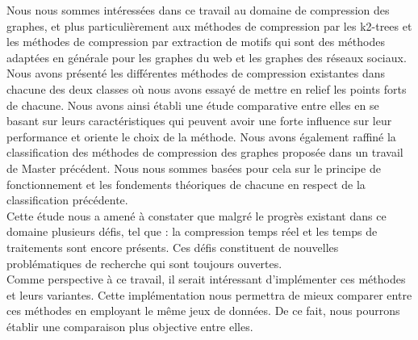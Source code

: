 \documentclass[a4paper,oneside,12pt]{report}
\theoremstyle{definition}
\begin{document}
		Nous nous sommes intéressées dans ce travail au domaine de compression des graphes, et plus particulièrement aux méthodes de compression par les k2-trees et les méthodes de compression par extraction de motifs qui sont des méthodes adaptées en générale pour les graphes du web et les graphes des réseaux sociaux. 
		Nous avons présenté les différentes méthodes de compression existantes dans chacune des deux classes où nous avons essayé de mettre en relief les points forts de chacune. Nous avons ainsi établi une étude comparative entre elles en se basant sur leurs caractéristiques qui peuvent avoir une forte influence sur leur performance et oriente le choix de la méthode. 
		Nous avons également raffiné la classification des méthodes de compression des graphes proposée dans un travail de Master précédent. Nous nous sommes basées pour cela sur le principe de fonctionnement et les fondements théoriques de chacune en respect de la classification précédente.\\  
	
	Cette étude nous a amené à constater que malgré le progrès existant dans ce domaine plusieurs défis, tel que : la compression temps réel et les temps de traitements sont encore présents. Ces défis constituent de nouvelles problématiques de recherche qui sont toujours ouvertes.\\
	
	Comme perspective à ce travail, il serait intéressant d'implémenter ces méthodes et leurs variantes. Cette implémentation nous permettra de mieux comparer entre ces méthodes en employant le même jeux de données. De ce fait, nous pourrons établir une comparaison plus objective entre elles.

\pagestyle{plain}
\newpage
\end{document}
